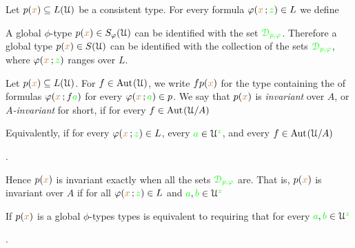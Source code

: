 Let $p({\color{brown} x})\subseteq L(\EuScript U)$ be a consistent type.
For every formula $\varphi({\color{brown} x}\,;{\color{green} z})\in L$ we define



A global $\phi$-type $p({\color{brown} x})\in S_\varphi(\EuScript U)$ can be identified with the set ${\color{green}\EuScript D_{p,\varphi}}$.
Therefore a global type $p({\color{brown} x})\in S(\EuScript U)$ can be identified with the collection of the sets ${\color{green}\EuScript D_{p,\varphi}}$, where $\varphi({\color{brown} x}\,;{\color{green} z})$ ranges over $L$.

Let $p({\color{brown} x})\subseteq L(\EuScript U)$.
For $f\in{\rm Aut\kern.15ex}(\EuScript U)$, we write $fp({\color{brown} x})$ for the type containing the of formulas $\varphi({\color{brown} x}\,;f{\color{green} a})$ for every $\varphi({\color{brown} x}\,;{\color{green} a})\in p$.
We say that $p({\color{brown} x})$ is \emph{invariant\/} over $A$, or \emph{$A$-invariant\/} for short, if for every $f\in{\rm Aut\kern.15ex}(\EuScript U/A)$


Equivalently, if for every $\varphi({\color{brown} x}\,;{\color{green} z})\in L$, every ${\color{green} a}\in\EuScript U^{\color{green} z}$, and every $f\in{\rm Aut\kern.15ex}(\EuScript U/A)$

.

Hence $p({\color{brown} x})$ is invariant exactly when all the sets $\color{green}\EuScript D_{p,\varphi}$ are.
That is, $p({\color{brown} x})$ is invariant over $A$ if  for all $\varphi({\color{brown} x}\,;{\color{green} z})\in L$ and ${\color{green} a},{\color{green} b}\in\EuScript U^{\color{green} z}$



If $p({\color{brown} x})$ is a global $\phi$-types types  is equivalent to requiring that for every ${\color{green} a},{\color{green} b}\in\EuScript U^{\color{green} z}$

.

